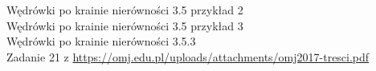 
 Wędrówki po krainie nierówności 3.5 przykład 2 \\
 Wędrówki po krainie nierówności 3.5 przykład 3 \\
 Wędrówki po krainie nierówności 3.5.3 \\
 Zadanie 21 z \url{https://omj.edu.pl/uploads/attachments/omj2017-tresci.pdf} \\